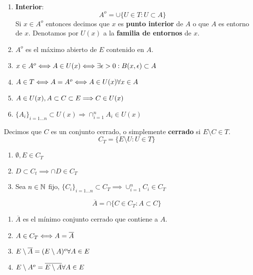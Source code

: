     \begin{definicion}\\
        \begin{enumerate}
            \item \textbf{Interior}:
            $$A^o = \cup \{U\in T: U \subset A\}$$
            Si $x\in A^o$ entonces decimos que $x$ es \textbf{punto interior} de $A$ o que $A$ es entorno de $x$. Denotamos por $U(x)$ a la \textbf{familia de entornos} de $x$. 
            \item $A^o$ es el máximo abierto de $E$ contenido en $A$.
            \item $x\in A^o \Longleftrightarrow A\in U(x) \Longleftrightarrow \exists \epsilon>0 : B(x, \epsilon ) \subset A$ 
            \item $A\in T \Longleftrightarrow A=A^o \Longleftrightarrow A\in U(x) \\ \forall x \in A$
            \item $A\in U(x), \\ A \subset C \subset E \Longrightarrow C \in U(x)$
            \item $\{ A_i \}_{i=1...n} \subset U(x) \Longrightarrow \cap_{i=1}^n A_i \in U(x)$
        \end{enumerate}
           
    \end{definicion}
   
    \begin{definicion}
        Decimos que $C$ es un conjunto cerrado, o simplemente \textbf{cerrado} si $E\setminus C \in T$. \\
        $$C_T = \{ E\setminus U : U \in T\}$$
        \begin{enumerate}
            \item $\emptyset, E \in C_T$
            \item $D \subset C_t  \implies \cap D \in C_T$
            \item Sea $ n\in \mathbb N$ fijo, $\{ C_i \}_{i=1...n} \subset C_T \implies \cup_{i=1}^n C_i \in C_T$ 
        \end{enumerate}    
    \end{definicion}
    
    \begin{definicion}[Cierre]
        $$\overline{A} = \cap \{ C \in C_T : A \subset C\}$$
        \begin{enumerate}
            \item $\overline{A}$ es el mínimo conjunto cerrado que contiene a $A$.
            \item $A \in C_T \Longleftrightarrow A = \overline{A}$
            \item $E\setminus \overline{A} = (E\setminus A)^o \\ \forall A \in E$
            \item $E\setminus A^o = \overline{E\setminus A} \\ \forall A \in E$
        \end{enumerate}
    \end{definicion}

